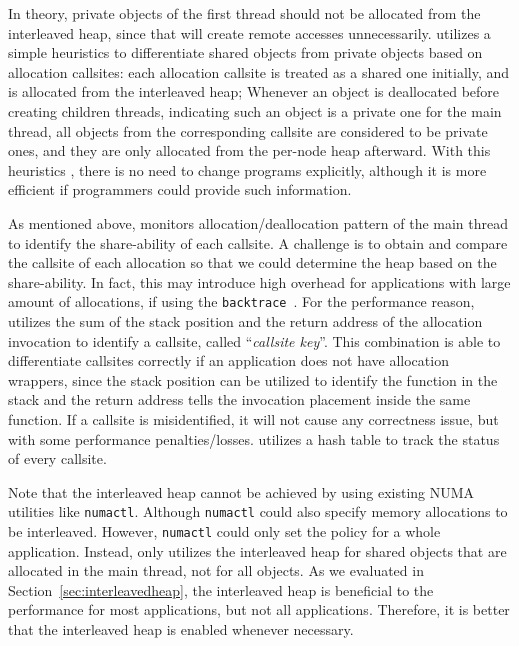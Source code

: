 In theory, private objects of the first thread should not be allocated from the interleaved heap, since that will create remote accesses unnecessarily. \NM{} utilizes a simple heuristics to differentiate shared objects from private objects based on allocation callsites: each allocation callsite is treated as a shared one initially, and is allocated from the interleaved heap; Whenever an object is deallocated before creating children threads, indicating such an object is a private one for the main thread, all objects from the corresponding callsite are considered to be private ones, and they are only allocated from the per-node heap afterward. With this heuristics , there is no need to change programs explicitly, although it is more efficient if programmers could provide such information. 

As mentioned above, \NM{} monitors allocation/deallocation pattern of the main thread to identify the share-ability of each callsite. 
A challenge is to obtain and compare the callsite of each allocation so that we could determine the heap based on the share-ability. In fact, this may introduce high overhead for applications with large amount of allocations, if using the \texttt{backtrace}~\cite{DBLP:conf/icse/SumnerZWZ10, DBLP:conf/cgo/ZengR0AJ014}. For the performance reason, \NA{} utilizes the sum of the stack position and the return address of the allocation invocation to identify a callsite, called ``\textit{callsite key}''. This combination is able to differentiate callsites correctly if an application does not have allocation wrappers, since the stack position can be utilized to identify the function in the stack and the return address tells the invocation placement inside the same function. If a callsite is misidentified, it will not cause any correctness issue, but with some performance penalties/losses. \NA{} utilizes a hash table to track the status of every callsite. 
 
Note that the interleaved heap cannot be achieved by using existing NUMA utilities like \texttt{numactl}. Although \texttt{numactl} could also specify memory allocations to be interleaved. However, \texttt{numactl} could only set the policy for a whole application. Instead, \NM{} only utilizes the interleaved heap for shared objects that are allocated in the main thread, not for all objects. As we evaluated in Section~\ref{sec:interleavedheap}, the interleaved heap is beneficial to the performance for most applications, but not all applications. Therefore, it is better that the interleaved heap is enabled whenever necessary. 

